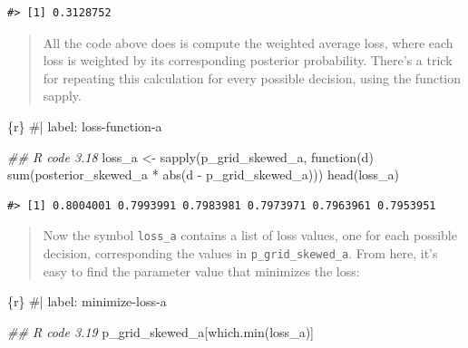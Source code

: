\documentclass[
  letterpaper,
  DIV=11,
  numbers=noendperiod]{scrreprt}
\newenvironment{Shaded}{\begin{snugshade}}{\end{snugshade}}
\newcommand{\CommentTok}[1]{\textcolor[rgb]{0.37,0.37,0.37}{#1}}
\newcommand{\ControlFlowTok}[1]{\textcolor[rgb]{0.00,0.23,0.31}{#1}}
\newcommand{\DocumentationTok}[1]{\textcolor[rgb]{0.37,0.37,0.37}{\textit{#1}}}
\newcommand{\FunctionTok}[1]{\textcolor[rgb]{0.28,0.35,0.67}{#1}}
\newcommand{\InformationTok}[1]{\textcolor[rgb]{0.37,0.37,0.37}{#1}}
\newcommand{\NormalTok}[1]{\textcolor[rgb]{0.00,0.23,0.31}{#1}}
\newcommand{\OtherTok}[1]{\textcolor[rgb]{0.00,0.23,0.31}{#1}}
\newcommand{\SpecialCharTok}[1]{\textcolor[rgb]{0.37,0.37,0.37}{#1}}
\begin{document}
\begin{verbatim}
#> [1] 0.3128752
\end{verbatim}

\begin{quote}
All the code above does is compute the weighted average loss, where each
loss is weighted by its corresponding posterior probability. There's a
trick for repeating this calculation for every possible decision, using
the function sapply.
\end{quote}

\begin{Shaded}
\begin{Highlighting}[]
\InformationTok{\textasciigrave{}\textasciigrave{}\textasciigrave{}\{r\}}
\CommentTok{\#| label: loss{-}function{-}a}

\DocumentationTok{\#\# R code 3.18}
\NormalTok{loss\_a }\OtherTok{\textless{}{-}} \FunctionTok{sapply}\NormalTok{(p\_grid\_skewed\_a, }\ControlFlowTok{function}\NormalTok{(d) }\FunctionTok{sum}\NormalTok{(posterior\_skewed\_a }\SpecialCharTok{*} \FunctionTok{abs}\NormalTok{(d }\SpecialCharTok{{-}}\NormalTok{ p\_grid\_skewed\_a)))}
\FunctionTok{head}\NormalTok{(loss\_a)}
\InformationTok{\textasciigrave{}\textasciigrave{}\textasciigrave{}}
\end{Highlighting}
\end{Shaded}

\begin{verbatim}
#> [1] 0.8004001 0.7993991 0.7983981 0.7973971 0.7963961 0.7953951
\end{verbatim}

\begin{quote}
Now the symbol \texttt{loss\_a} contains a list of loss values, one for
each possible decision, corresponding the values in
\texttt{p\_grid\_skewed\_a}. From here, it's easy to find the parameter
value that minimizes the loss:
\end{quote}

\begin{Shaded}
\begin{Highlighting}[]
\InformationTok{\textasciigrave{}\textasciigrave{}\textasciigrave{}\{r\}}
\CommentTok{\#| label: minimize{-}loss{-}a}

\DocumentationTok{\#\# R code 3.19}
\NormalTok{p\_grid\_skewed\_a[}\FunctionTok{which.min}\NormalTok{(loss\_a)]}
\InformationTok{\textasciigrave{}\textasciigrave{}\textasciigrave{}}
\end{Highlighting}
\end{Shaded}
\end{document}
